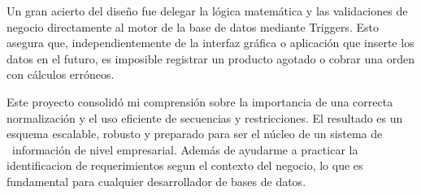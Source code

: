 \documentclass{article}
\begin{document}
Un gran acierto del diseño fue delegar la lógica matemática y las validaciones de negocio directamente al motor de la base de datos mediante Triggers. Esto asegura que, independientemente de la interfaz gráfica o aplicación que inserte los 
datos en el futuro, es imposible registrar un producto agotado o cobrar una orden con cálculos erróneos.  

Este proyecto consolidó mi comprensión sobre la importancia de una correcta normalización y el uso eficiente de secuencias y restricciones. El resultado es un esquema escalable, robusto y preparado para ser el núcleo de un sistema de \
información de nivel empresarial. Además de ayudarme a practicar la identificacion de requerimientos segun el contexto del negocio, lo que es fundamental para cualquier desarrollador de bases de datos.
\end{document}
